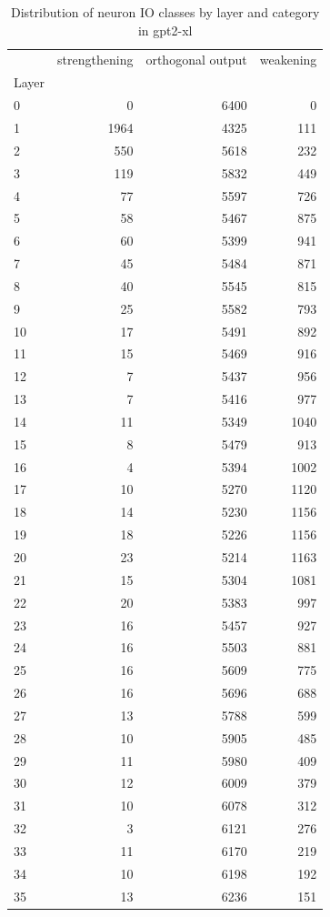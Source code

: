 \begin{table}
\caption{Distribution of neuron IO classes by layer and category in gpt2-xl}
\label{tab:gpt2-xl}
\begin{tabular}{lrrr}
 & strengthening & orthogonal output & weakening \\
Layer &  &  &  \\
0 & 0 & 6400 & 0 \\
1 & 1964 & 4325 & 111 \\
2 & 550 & 5618 & 232 \\
3 & 119 & 5832 & 449 \\
4 & 77 & 5597 & 726 \\
5 & 58 & 5467 & 875 \\
6 & 60 & 5399 & 941 \\
7 & 45 & 5484 & 871 \\
8 & 40 & 5545 & 815 \\
9 & 25 & 5582 & 793 \\
10 & 17 & 5491 & 892 \\
11 & 15 & 5469 & 916 \\
12 & 7 & 5437 & 956 \\
13 & 7 & 5416 & 977 \\
14 & 11 & 5349 & 1040 \\
15 & 8 & 5479 & 913 \\
16 & 4 & 5394 & 1002 \\
17 & 10 & 5270 & 1120 \\
18 & 14 & 5230 & 1156 \\
19 & 18 & 5226 & 1156 \\
20 & 23 & 5214 & 1163 \\
21 & 15 & 5304 & 1081 \\
22 & 20 & 5383 & 997 \\
23 & 16 & 5457 & 927 \\
24 & 16 & 5503 & 881 \\
25 & 16 & 5609 & 775 \\
26 & 16 & 5696 & 688 \\
27 & 13 & 5788 & 599 \\
28 & 10 & 5905 & 485 \\
29 & 11 & 5980 & 409 \\
30 & 12 & 6009 & 379 \\
31 & 10 & 6078 & 312 \\
32 & 3 & 6121 & 276 \\
33 & 11 & 6170 & 219 \\
34 & 10 & 6198 & 192 \\
35 & 13 & 6236 & 151 \\

\end{tabular}
\end{table}

